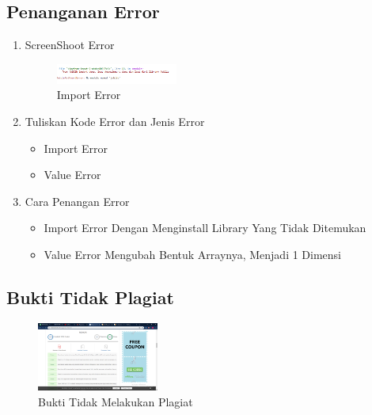 \subsection{Penanganan Error}
\begin{enumerate}
	\item ScreenShoot Error
	\begin{figure}[H]
		\includegraphics[width=4cm]{figures/1174002/chapter1/error/error.png}
		\centering
		\caption{Import Error}
	\end{figure}
	\item Tuliskan Kode Error dan Jenis Error
	\begin{itemize}
		\item Import Error
		\item Value Error
	\end{itemize}
	\item Cara Penangan Error
	\begin{itemize}
		\item Import Error
		\hfill\break
		Dengan Menginstall Library Yang Tidak Ditemukan
		\item Value Error
		\hfill\break
		Mengubah Bentuk Arraynya, Menjadi 1 Dimensi
	\end{itemize}
\end{enumerate}
\subsection{Bukti Tidak Plagiat}
\begin{figure}[H]
	\includegraphics[width=4cm]{figures/1174002/chapter1/plagiat.PNG}
	\centering
	\caption{Bukti Tidak Melakukan Plagiat}
\end{figure}